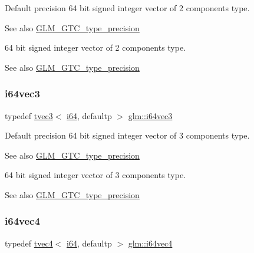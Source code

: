Default precision 64 bit signed integer vector of 2 components type. \begin{DoxySeeAlso}{See also}
\hyperlink{group__gtc__type__precision}{G\+L\+M\+\_\+\+G\+T\+C\+\_\+type\+\_\+precision}
\end{DoxySeeAlso}
64 bit signed integer vector of 2 components type. \begin{DoxySeeAlso}{See also}
\hyperlink{group__gtc__type__precision}{G\+L\+M\+\_\+\+G\+T\+C\+\_\+type\+\_\+precision} 
\end{DoxySeeAlso}
\mbox{\label{group__gtc__type__precision_ga189eb8d6a197bc491cabb6e1f120ecf4}} 
\subsubsection{\texorpdfstring{i64vec3}{i64vec3}}
{\footnotesize\ttfamily typedef \hyperlink{structglm_1_1tvec3}{tvec3}$<$ \hyperlink{group__gtc__type__precision_gac7a7eaad46064fc952b06df33689da23}{i64}, defaultp $>$ \hyperlink{group__gtc__type__precision_ga189eb8d6a197bc491cabb6e1f120ecf4}{glm\+::i64vec3}}

Default precision 64 bit signed integer vector of 3 components type. \begin{DoxySeeAlso}{See also}
\hyperlink{group__gtc__type__precision}{G\+L\+M\+\_\+\+G\+T\+C\+\_\+type\+\_\+precision}
\end{DoxySeeAlso}
64 bit signed integer vector of 3 components type. \begin{DoxySeeAlso}{See also}
\hyperlink{group__gtc__type__precision}{G\+L\+M\+\_\+\+G\+T\+C\+\_\+type\+\_\+precision} 
\end{DoxySeeAlso}
\mbox{\label{group__gtc__type__precision_gade5e969a6155752095d2cd603bda9408}} 
\subsubsection{\texorpdfstring{i64vec4}{i64vec4}}
{\footnotesize\ttfamily typedef \hyperlink{structglm_1_1tvec4}{tvec4}$<$ \hyperlink{group__gtc__type__precision_gac7a7eaad46064fc952b06df33689da23}{i64}, defaultp $>$ \hyperlink{group__gtc__type__precision_gade5e969a6155752095d2cd603bda9408}{glm\+::i64vec4}}

